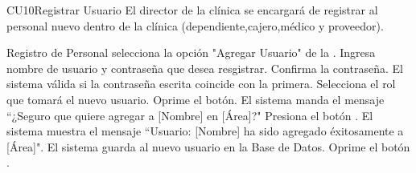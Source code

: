 
% 



	\begin{UseCase}{CU10}{Registrar Usuario}{
		El director de la clínica se encargará de registrar al personal nuevo dentro de la clínica (dependiente,cajero,médico y proveedor).
	}
	\end{UseCase}

	\begin{UCtrayectoria}{Registro de Personal}
	\UCpaso[\UCactor] selecciona la opci\'on "Agregar Usuario"  de la  \label{CU10RegistroUsuario}.
		\UCpaso[\UCactor] Ingresa nombre de usuario y contraseña que desea resgistrar. 
		\UCpaso[\UCactor] Confirma la contraseña.
		\UCpaso El sistema válida si la contraseña escrita coincide con la primera.
		\UCpaso[\UCactor]Selecciona el rol que tomará el nuevo usuario.
		\UCpaso[\UCactor] Oprime el botón.
		\UCpaso El sistema manda el mensaje ``¿Seguro que quiere agregar a [Nombre] en [Área]?"
		\UCpaso[\UCactor] Presiona el botón .
		\UCpaso El sistema muestra el mensaje ``Usuario: [Nombre] ha sido agregado éxitosamente a [Área]".
		\UCpaso El sistema guarda al nuevo usuario en la Base de Datos. 
		\UCpaso[\UCactor]Oprime el botón .
	\end{UCtrayectoria}
		
